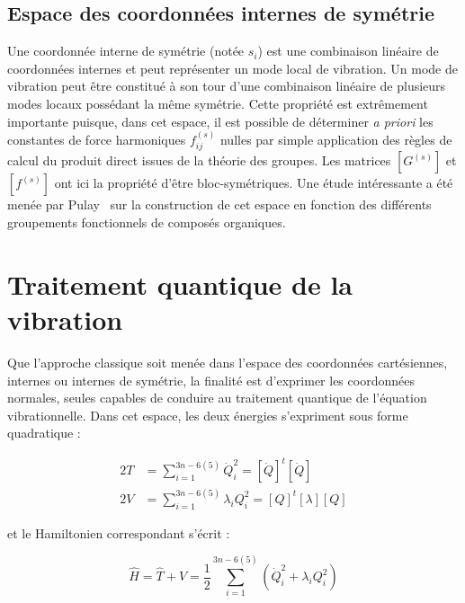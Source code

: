 \subsection{Espace des coordonnées internes de symétrie}

Une coordonnée interne de symétrie (notée $s_i$) est une combinaison linéaire de coordonnées internes et peut représenter un mode local de vibration. Un mode de vibration peut être constitué à son tour d'une combinaison linéaire de plusieurs modes locaux possédant la même symétrie. Cette propriété est extrêmement importante puisque, dans cet espace, il est possible de déterminer \textit{a priori} les constantes de force harmoniques $f^{(s)}_{ij}$ nulles par simple application des règles de calcul du produit direct issues de la théorie des groupes. Les matrices $\left[G^{(s)}\right]$ et $\left[f^{(s)}\right]$ ont ici la propriété d'être bloc-symétriques. Une étude intéressante a été menée par Pulay~\cite{pulay1979systematic} sur la construction de cet espace en fonction des différents groupements fonctionnels de composés organiques.


\section{Traitement quantique de la vibration}

Que l'approche classique soit menée dans l'espace des coordonnées cartésiennes, internes ou internes de symétrie, la finalité est d'exprimer les coordonnées normales, seules capables de conduire au traitement quantique de l'équation vibrationnelle. Dans cet espace, les deux énergies s'expriment sous forme quadratique :

\begin{align}
2T &= \sum^{3n-6(5)}_{i=1} \dot{Q}^2_i = \left[\dot{Q}\right]^t\left[\dot{Q}\right] \\
2V &= \sum^{3n-6(5)}_{i=1} \lambda_i Q^2_i = \left[Q\right]^t\left[\lambda\right]\left[Q\right]
\end{align}

\noindent et le Hamiltonien correspondant s'écrit :

\begin{equation}
\hat{H} = \hat{T} + \hat{V} = \frac{1}{2} \sum^{3n-6(5)}_{i=1} \left(\dot{Q}^2_i + \lambda_i Q^2_i\right)
\end{equation}

